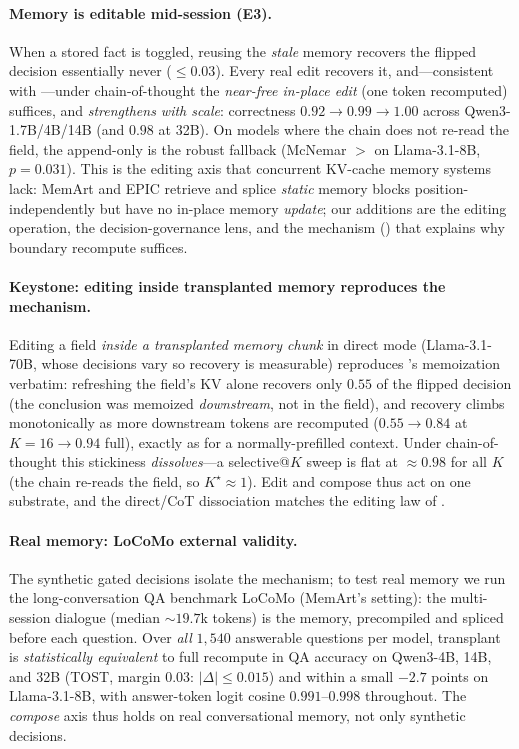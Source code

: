\paragraph{Memory is editable mid-session (E3).} When a stored fact is toggled, reusing the
\emph{stale} memory recovers the flipped decision essentially never ($\le0.03$). Every real
edit recovers it, and---consistent with ---under chain-of-thought the
\emph{near-free in-place edit} (one token recomputed) suffices, and \emph{strengthens with
scale}: correctness $0.92\rightarrow0.99\rightarrow1.00$ across Qwen3-1.7B/4B/14B (and $0.98$
at 32B). On models where the chain does not re-read the field, the append-only \erratum{} is
the robust fallback (McNemar \erratum{}$>$\inplace{} on Llama-3.1-8B, $p=0.031$). This is the editing axis
that concurrent KV-cache memory systems lack: MemArt \citep{memart2026} and EPIC
\citep{hu2025epic} retrieve and splice \emph{static} memory blocks position-independently but
have no in-place memory \emph{update}; our additions are the editing operation, the
decision-governance lens, and the mechanism () that explains why boundary
recompute suffices.

\paragraph{Keystone: editing inside transplanted memory reproduces the mechanism.} Editing a
field \emph{inside a transplanted memory chunk} in direct mode (Llama-3.1-70B, whose decisions
vary so recovery is measurable) reproduces 's memoization verbatim:
refreshing the field's KV alone recovers only $0.55$ of the flipped decision (the conclusion was
memoized \emph{downstream}, not in the field), and recovery climbs monotonically as more
downstream tokens are recomputed ($0.55\rightarrow0.84$ at $K{=}16\rightarrow0.94$ full),
exactly as for a normally-prefilled context. Under chain-of-thought this stickiness
\emph{dissolves}---a selective@$K$ sweep is flat at ${\approx}0.98$ for all $K$ (the chain
re-reads the field, so $K^\star{\approx}1$). Edit and compose thus act on one substrate, and the
direct/CoT dissociation matches the editing law of .

\paragraph{Real memory: LoCoMo external validity.} The synthetic gated decisions isolate the
mechanism; to test real memory we run the long-conversation QA benchmark LoCoMo
\citep{maharana2024locomo} (MemArt's setting): the multi-session dialogue (median
${\sim}19.7$k tokens) is the memory, precompiled and spliced before each question. Over
\emph{all} $1{,}540$ answerable questions per model, transplant is \emph{statistically
equivalent} to full recompute in QA accuracy on Qwen3-4B, 14B, and 32B (TOST, margin $0.03$:
$|\Delta|\le0.015$) and within a small $-2.7$ points on Llama-3.1-8B, with answer-token logit
cosine $0.991$--$0.998$ throughout. The \emph{compose} axis thus holds on
real conversational memory, not only synthetic decisions.

